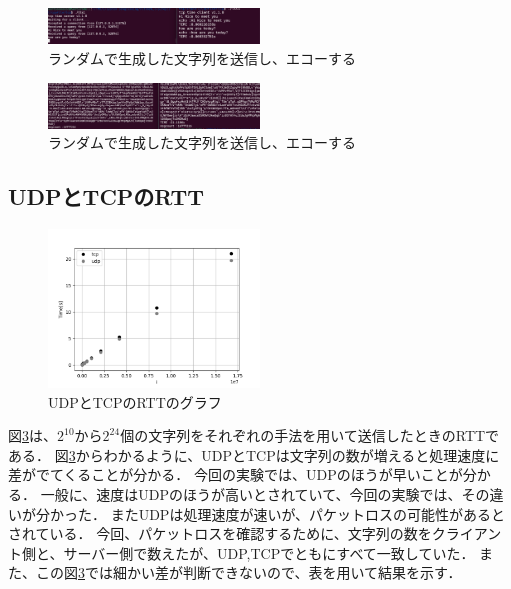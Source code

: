 \documentclass[fleqn, a4paper. 12pt]{ltjsarticle}
\begin{document}
    \begin{figure}[htbp]
      \includegraphics[width=0.5\textwidth]{images/tcp_echo.png}
      \caption{ランダムで生成した文字列を送信し、エコーする}
      \label{fig:udp_rand}
    \end{figure}

    \begin{figure}[htbp]
      \includegraphics[width=0.5\textwidth]{images/tcp_rand.png}
      \caption{ランダムで生成した文字列を送信し、エコーする}
      \label{fig:udp_rand}
    \end{figure}

    \newpage
    \subsection{UDPとTCPのRTT}

    \begin{figure}[htbp]
      \includegraphics[width=0.5\textwidth]{plot.png}
      \caption{UDPとTCPのRTTのグラフ}
      \label{fig:RTT}
    \end{figure}
    図\ref{fig:RTT}は、$2^{10}から2^{24}$個の文字列をそれぞれの手法を用いて送信したときのRTTである．
    図\ref{fig:RTT}からわかるように、UDPとTCPは文字列の数が増えると処理速度に差がでてくることが分かる．
    今回の実験では、UDPのほうが早いことが分かる．
    一般に、速度はUDPのほうが高いとされていて、今回の実験では、その違いが分かった．
    またUDPは処理速度が速いが、パケットロスの可能性があるとされている．
    今回、パケットロスを確認するために、文字列の数をクライアント側と、サーバー側で数えたが、UDP,TCPでともにすべて一致していた．
    また、この図\ref{fig:RTT}では細かい差が判断できないので、表を用いて結果を示す．
    
\end{document}
